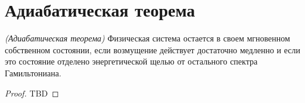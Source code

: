 \section{Адиабатическая теорема}

\begin{theorem}
\emph{(Адиабатическая теорема)}
\label{addQAdiabatic}
Физическая система остается в своем мгновенном собственном состоянии,
если возмущение действует достаточно медленно и если это состояние
отделено энергетической щелью от остального спектра Гамильтониана.
\end{theorem}

\begin{proof}
  TBD
\end{proof}
